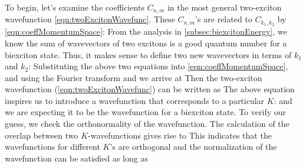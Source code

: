 To begin, let's examine the coefficients $C_{n,m}$ in the most general two-exciton wavefunction
 \autoref{eqn:twoExcitonWavefunc}. These $C_{n,m}$'s are related to $C_{k_1, k_2}$ by \autoref{eqn:coeffMomentumSpace}:
 From the analysis in
 \autoref{subsec:biexcitonEnergy}, we know the sum of wavevectors of two excitons is a good quantum number
for a biexciton state. Thus, it makes sense to define two new wavevectors in terms of $k_1$ and $k_2$:
Substituting the above two equations into \autoref{eqn:coeffMomentumSpace}, and using the Fourier transform
and 
we arrive at
Then the two-exciton wavefunction (\autoref{eqn:twoExcitonWavefunc}) can be written as
The above equation inspires us to introduce a wavefunction that corresponds to a particular $K$:
and we are expecting it to be the wavefunction for a biexciton state. To verify our guess, we check the orthonormality
 of  the wavefunction. The calculation of the overlap between two $K$-wavefunctions gives rise to
This indicates that the wavefunctions for different $K$'s are orthogonal and the normalization of the wavefunction
 can be satisfied as long as


